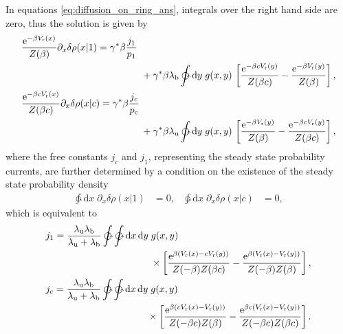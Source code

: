 \documentclass[aps,pre,twocolumn,showpacs,showkeys,superscriptaddress,floatfix]{revtex4-1}
\newcommand{\rmd}{{\mathrm d}}
\newcommand{\rme}{{\mathrm e}}
\begin{document}
In equations \eqref{eq:diffusion_on_ring_ans}, integrals over the right hand side are zero, thus the solution is given by 
\begin{gather*}
\begin{multlined}[.95\linewidth]
\frac{ \rme^{-\beta V_\text{r}(x) } }{ Z(\beta) } \partial_x \delta \rho(x|1)  
= \gamma^* \beta \frac{ j_1 }{ p_1 } \\
+ \gamma^* \beta \lambda_\text{b} 
\ointctrclockwise \rmd y \; g(x,y) \, \left[ \frac{ \rme^{ - \beta c V_\text{r}(y) } }{Z(\beta c)} - \frac{ \rme^{ - \beta V_\text{r}(y) } }{ Z(\beta) } \right] , 
\end{multlined} 
\\
\begin{multlined}[.95\linewidth]
\frac{ \rme^{-\beta c V_\text{r}(x) } }{ Z(\beta c) } \partial_x \delta \rho(x|c)  
= \gamma^* \beta \frac{ j_c }{ p_c } \\
+ \gamma^* \beta \lambda_\text{u}
\ointctrclockwise \rmd y \; g(x,y) \, \left[ \frac{ \rme^{ - \beta V_\text{r}(y) } }{Z(\beta)} - \frac{ \rme^{ - \beta c V_\text{r}(y) } }{ Z(\beta c ) } \right] , 
\end{multlined}
\end{gather*}
where the free constants $j_c$ and $j_1$, representing the steady state probability currents, 
are further determined by a condition on the existence of the steady state probability density 
\begin{align*}
\ointctrclockwise \rmd x \; \partial_x \delta \rho(x|1) &= 0, &
\ointctrclockwise \rmd x \; \partial_x \delta \rho(x|c) &= 0, 
\end{align*}
which is equivalent to 
\begin{equation}
\begin{gathered}
\begin{multlined}[c][.8\linewidth]
j_1 = \frac{ \lambda_\text{u} \lambda_\text{b} }{ \lambda_\text{u} + \lambda_\text{b} } \ointctrclockwise \ointctrclockwise \rmd x \, \rmd y \; g(x,y) 
\\ \times 
\left[ \frac{ \rme^{ \beta ( V_\text{r}(x) -  c V_\text{r}(y) ) } }{Z(-\beta) Z(\beta c)} - \frac{ \rme^{ \beta ( V_\text{r}(x) - V_\text{r}(y) ) } }{ Z(-\beta) Z(\beta) } \right] , 
\end{multlined}
\\
\begin{multlined}[c][.8\linewidth]
j_c = \frac{ \lambda_\text{u} \lambda_\text{b} }{ \lambda_\text{u} + \lambda_\text{b} } \ointctrclockwise \ointctrclockwise \rmd x \, \rmd y \; g(x,y)  
\\ \times 
\left[ \frac{ \rme^{ \beta (c V_\text{r}(x) - V_\text{r}(y) ) } }{Z( - \beta c ) Z(\beta)} - \frac{ \rme^{ \beta c ( V_\text{r}(x) - V_\text{r}(y) ) } }{ Z( - \beta c ) Z(\beta c ) } \right] . 
\end{multlined}
\end{gathered}
\label{eq:steady_currents}
\end{equation}
\end{document}
